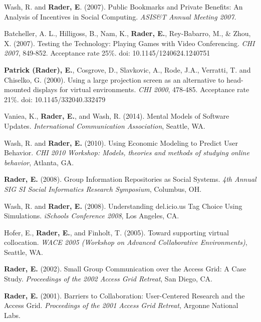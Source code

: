 \documentclass[9pt]{extarticle}
\makeatletter
\renewcommand{\section}{%
  \@startsection{section}{1}{0em}{\baselineskip}{3pt}{\large\bfseries\textsc}}
\makeatother
\begin{document}
Wash, R. and \textbf{Rader, E}. (2007). Public Bookmarks and Private Benefits: An Analysis of Incentives in Social Computing. \emph{ASIS\&T Annual Meeting 2007.}

Batcheller, A. L., Hilligoss, B., Nam, K., \textbf{Rader, E.}, Rey-Babarro, M., \& Zhou, X. (2007). Testing the Technology: Playing Games with Video Conferencing. \emph{CHI 2007}, 849-852. Acceptance rate 25\%. doi: 10.1145/1240624.1240751

\textbf{Patrick (Rader), E.}, Cosgrove, D., Slavkovic, A., Rode, J.A., Verratti, T. and Chiselko, G. (2000). Using a large projection screen as an alternative to head-mounted displays for virtual environments. \emph{CHI 2000}, 478-485. Acceptance rate 21\%. doi: 10.1145/332040.332479


\newpage
\section{Conference and Workshop Papers}

Vaniea, K., \textbf{Rader, E.}, and Wash, R. (2014). Mental Models of Software Updates. \emph{International Communication Association},  Seattle, WA.

Wash, R. and \textbf{Rader, E.} (2010). Using Economic Modeling to Predict User Behavior. \emph{CHI 2010 Workshop: Models, theories and methods of studying online behavior}, Atlanta, GA.

\textbf{Rader, E.} (2008). Group Information Repositories as Social Systems. \emph{4th Annual SIG SI Social Informatics Research Symposium}, Columbus, OH.

Wash, R. and \textbf{Rader, E.} (2008). Understanding del.icio.us Tag Choice Using Simulations. \emph{iSchools Conference 2008}, Los Angeles, CA.

Hofer, E., \textbf{Rader, E.}, and Finholt, T. (2005). Toward supporting virtual collocation. \emph{WACE 2005 (Workshop on Advanced Collaborative Environments)}, Seattle, WA.

\textbf{Rader, E.} (2002). Small Group Communication over the Access Grid: A Case Study. \emph{Proceedings of the 2002 Access Grid Retreat}, San Diego, CA.

\textbf{Rader, E.} (2001). Barriers to Collaboration: User-Centered Research and the Access Grid. \emph{Proceedings of the 2001 Access Grid Retreat}, Argonne National Labs.
\end{document}
